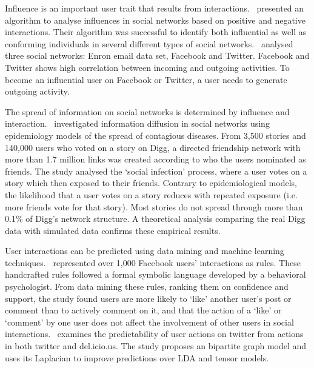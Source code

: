 \documentclass[letterpaper]{article}
\begin{document}
Influence is an important user trait that results from interactions.~\cite{li2011casino} presented an algorithm to analyse influences in social networks based on positive and negative interactions. Their algorithm was successful to identify both influential as well as conforming individuals in several different types of social networks.~\cite{saez2011high} analysed three social networks: Enron email data set, Facebook and Twitter. Facebook and Twitter shows high correlation between incoming and outgoing activities. To become an influential user on Facebook or Twitter, a user needs to generate outgoing activity.


The spread of information on social networks is determined by influence and interaction.~\cite{ver2011stops} investigated information diffusion in social networks using epidemiology models of the spread of contagious diseases. From 3,500 stories and 140,000 users who voted on a story on Digg, a directed friendship network with more than 1.7 million links was created according to who the users nominated as friends. The study analysed the `social infection' process, where a user votes on a story which then exposed to their friends. Contrary to epidemiological models, the likelihood that a user votes on a story reduces with repeated exposure (i.e. more friends vote for that story). Most stories do not spread through more than 0.1\% of Digg’s network structure. A theoretical analysis comparing the real Digg data with simulated data confirms these empirical results.


User interactions can be predicted using data mining and machine learning techniques.~\cite{gomes2011social} represented over 1,000 Facebook users' interactions as rules. These handcrafted rules followed a formal symbolic language developed by a behavioral psychologist. From data mining these rules, ranking them on confidence and support, the study found users are more likely to `like' another user's post or comment than to actively comment on it, and that the action of a `like' or `comment' by one user does not affect the involvement of other users in social interactions.~\cite{nori2011exploiting} examines the predictability of user actions on twitter from actions in both twitter and del.icio.us. The study proposes an bipartite graph model and uses its Laplacian to improve predictions over LDA and tensor models.






\end{document}
